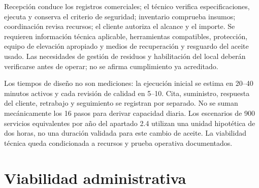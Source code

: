 {Recepción conduce los registros comerciales; el técnico verifica especificaciones, ejecuta y conserva el criterio de seguridad; inventario comprueba insumos; coordinación revisa recursos; el cliente autoriza el alcance y el importe. Se requieren información técnica aplicable, herramientas compatibles, protección, equipo de elevación apropiado y medios de recuperación y resguardo del aceite usado. Las necesidades de gestión de residuos y habilitación del local deberán verificarse antes de operar; no se afirma cumplimiento ya acreditado.

Los tiempos de diseño no son mediciones: la ejecución inicial se estima en 20--40 minutos activos y cada revisión de calidad en 5--10. Cita, suministro, respuesta del cliente, retrabajo y seguimiento se registran por separado. No se suman mecánicamente los 16 pasos para derivar capacidad diaria. Los escenarios de 900 servicios equivalentes por año del apartado 2.4 utilizan una unidad hipotética de dos horas, no una duración validada para este cambio de aceite. La viabilidad técnica queda condicionada a recursos y prueba operativa documentados.
\section{Viabilidad administrativa}
}
